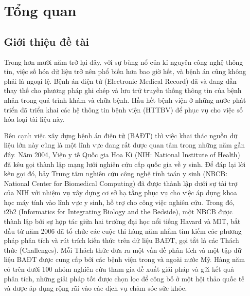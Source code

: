 \chapter{Tổng quan}
\section{Giới thiệu đề tài\label{gioithieudetai}}
Trong hơn mười năm trở lại đây, với sự bùng nổ của kỉ nguyên công nghệ thông tin, việc số hóa dữ liệu trở nên phổ biến hơn bao giờ hết, và bệnh án cũng không phải là ngoại lệ. Bệnh án điện tử (Electronic Medical Record) đã và đang dần thay thế cho phương pháp ghi chép và lưu trữ truyền thống thông tin của bệnh nhân trong quá trình khám và chữa bệnh. Hầu hết bệnh viện ở những nước phát triển đã triển khai các hệ thông tin bệnh viện (HTTBV) để phục vụ cho việc số hóa loại tài liệu này.

Bên cạnh việc xây dựng bệnh án điện tử (BAĐT) thì việc khai thác nguồn dữ liệu lớn này cũng là một lĩnh vực đang rất được quan tâm trong những năm gần đây. Năm 2004, Viện y tế Quốc gia Hoa Kì (NIH: National Institute of Health) đã kêu gọi thành lập mạng lưới nghiên cứu cấp quốc gia về y sinh. Để đáp lại lời kêu gọi đó, bảy Trung tâm nghiên cứu công nghệ tính toán y sinh (NBCB: National Center for Biomedical Computing) đã được thành lập dưới sự tài trợ của NIH với nhiệm vụ xây dựng cơ sở hạ tầng phục vụ cho việc áp dụng khoa học máy tính vào lĩnh vực y sinh, hỗ trợ cho công việc nghiên cứu. Trong đó, i2b2 (Informatics for Integrating Biology and the Bedside), một NBCB được thành lập bởi sự hợp tác giữa hai trường đại học nổi tiếng Havard và MIT, bắt đầu từ năm 2006 đã tổ chức các cuộc thi hàng năm nhằm tìm kiếm các phương pháp phân tích và rút trích kiến thức trên dữ liệu BAĐT, gọi tắt là các Thách thức (Challenges). Mỗi Thách thức đưa ra một vấn đề phân tích và một tập dữ liệu BAĐT được cung cấp bởi các bệnh viện trong và ngoài nước Mỹ. Hàng năm có trên dưới 100 nhóm nghiên cứu tham gia đề xuất giải pháp và gửi kết quả phân tích, những giải pháp tốt được chọn lọc để công bố ở một hội thảo quốc tế và được áp dụng rộng rãi vào các dịch vụ chăm sóc sức khỏe.

